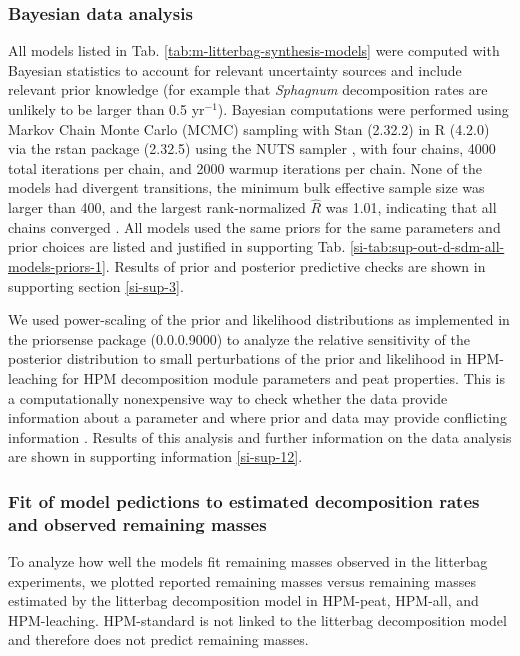 \documentclass[esd, manuscript]{copernicus}
\begin{document}
\hypertarget{sdm-003-methods-13}{%
\subsubsection{Bayesian data analysis}\label{sdm-003-methods-13}}

All models listed in Tab. \ref{tab:m-litterbag-synthesis-models} were computed with Bayesian statistics to account for relevant uncertainty sources and include relevant prior knowledge (for example that \emph{Sphagnum} decomposition rates are unlikely to be larger than 0.5 yr\(^{-1}\)). Bayesian computations were performed using Markov Chain Monte Carlo (MCMC) sampling with Stan (2.32.2) \citep{StanDevelopmentTeam.2021a} in R (4.2.0) \citep{RCoreTeam.2022} via the rstan package (2.32.5) \citep{StanDevelopmentTeam.2021b} using the NUTS sampler \citep{Hoffman.2014}, with four chains, 4000 total iterations per chain, and 2000 warmup iterations per chain. None of the models had divergent transitions, the minimum bulk effective sample size was larger than 400, and the largest rank-normalized \(\hat{R}\) was 1.01, indicating that all chains converged \citep{Vehtari.2021}. All models used the same priors for the same parameters and prior choices are listed and justified in supporting Tab. \ref{si-tab:sup-out-d-sdm-all-models-priors-1}. Results of prior and posterior predictive checks are shown in supporting section \ref{si-sup-3}.

We used power-scaling of the prior and likelihood distributions as implemented in the priorsense package (0.0.0.9000) \citep{Kallioinen.2024} to analyze the relative sensitivity of the posterior distribution to small perturbations of the prior and likelihood in HPM-leaching for HPM decomposition module parameters and peat properties. This is a computationally nonexpensive way to check whether the data provide information about a parameter and where prior and data may provide conflicting information \citep{Kallioinen.2024}. Results of this analysis and further information on the data analysis are shown in supporting information \ref{si-sup-12}.

\hypertarget{sdm-003-methods-9}{%
\subsubsection{Fit of model pedictions to estimated decomposition rates and observed remaining masses}\label{sdm-003-methods-9}}

To analyze how well the models fit remaining masses observed in the litterbag experiments, we plotted reported remaining masses versus remaining masses estimated by the litterbag decomposition model in HPM-peat, HPM-all, and HPM-leaching. HPM-standard is not linked to the litterbag decomposition model and therefore does not predict remaining masses.
\end{document}
